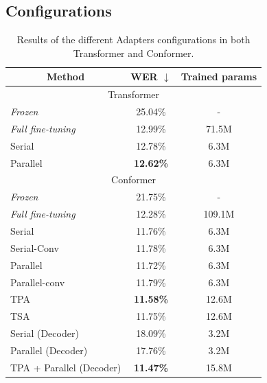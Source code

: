 \subsection{Configurations}
\begin{table}[t]
\caption{Results of the different Adapters configurations in both Transformer and Conformer.}
\begin{center}    
\begin{tabular}{ccc}
\hline
 Method & WER $\downarrow$     & Trained params    \\ \hline \hline
\multicolumn{3}{c}{Transformer} \\ \hline
\multicolumn{1}{l}{\textit{Frozen}} & 25.04\%   & - \\
\multicolumn{1}{l}{\textit{Full fine-tuning}} & 12.99\% & 71.5M \\ \hline
\multicolumn{1}{l}{Serial}  &   12.78\% & 6.3M  \\ 
\multicolumn{1}{l}{Parallel}  &     \textbf{12.62\%} & 6.3M  \\ \hline\hline
\multicolumn{3}{c}{Conformer} \\ \hline
\multicolumn{1}{l}{\textit{Frozen}} & 21.75\%   & - \\ 
\multicolumn{1}{l}{\textit{Full fine-tuning}} & 12.28\% & 109.1M \\ \hline
\multicolumn{1}{l}{Serial}  &   11.76\% & 6.3M  \\ %
\multicolumn{1}{l}{Serial-Conv} & 11.78\%     & 6.3M  \\
\multicolumn{1}{l}{Parallel}    & 11.72\% & 6.3M  \\ %
\multicolumn{1}{l}{Parallel-conv} & 11.79\%      & 6.3M  \\ %
\multicolumn{1}{l}{TPA} & \textbf{11.58\%}     & 12.6M  \\ %
\multicolumn{1}{l}{TSA} & 11.75\%     & 12.6M  \\ \hline %
\multicolumn{1}{l}{Serial (Decoder)} & 18.09\%     & 3.2M  \\ 
\multicolumn{1}{l}{Parallel (Decoder)} &17.76\%     & 3.2M  \\ \hline
\multicolumn{1}{l}{TPA + Parallel (Decoder)} & \textbf{11.47\%}     & 15.8M  \\ \hline

\end{tabular}
\end{center}

\label{tab:res}
\end{table}

